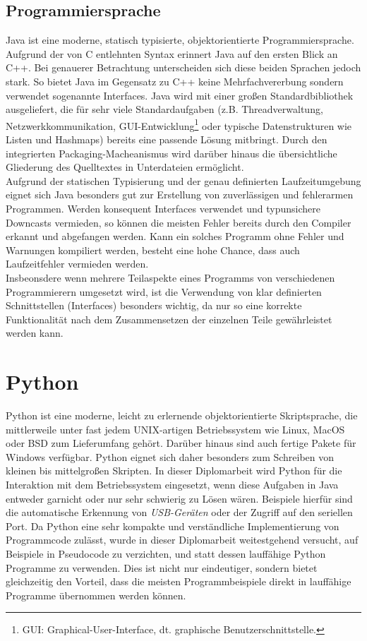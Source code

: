     \subsection{Programmiersprache}
        Java ist eine moderne, statisch typisierte, objektorientierte Programmiersprache. Aufgrund der von C entlehnten 
        Syntax erinnert Java auf den ersten Blick an C++. Bei genauerer Betrachtung unterscheiden sich diese beiden 
        Sprachen jedoch stark. So bietet Java im Gegensatz zu C++ keine Mehrfachvererbung sondern verwendet sogenannte
        Interfaces. Java wird mit einer großen Standardbibliothek ausgeliefert, die für sehr viele Standardaufgaben
        (z.B. Threadverwaltung, Netzwerkkommunikation, GUI-Entwicklung\footnote{GUI: Graphical-User-Interface, dt. 
        graphische Benutzerschnittstelle.} oder typische Datenstrukturen wie Listen und Hashmaps) bereits eine
        passende Lösung mitbringt. Durch den integrierten Packaging-Macheanismus wird darüber hinaus die übersichtliche
        Gliederung des Quelltextes in Unterdateien ermöglicht.\\
        Aufgrund der statischen Typisierung und der genau definierten Laufzeitumgebung eignet sich Java besonders
        gut zur Erstellung von zuverlässigen und fehlerarmen Programmen. Werden konsequent Interfaces verwendet und
        typunsichere Downcasts vermieden, so können die meisten Fehler bereits durch den Compiler erkannt und abgefangen 
        werden. Kann ein solches Programm ohne Fehler und Warnungen kompiliert werden, besteht eine hohe Chance,
        dass auch Laufzeitfehler vermieden werden.\\
        Insbeonsdere wenn mehrere Teilaspekte eines Programms von verschiedenen Programmierern umgesetzt wird, 
        ist die Verwendung von klar definierten Schnittstellen (Interfaces) besonders wichtig, da nur so eine korrekte
        Funktionalität nach dem Zusammensetzen der einzelnen Teile gewährleistet werden kann.

\section{Python}
    Python ist eine moderne, leicht zu erlernende objektorientierte Skriptsprache, die mittlerweile unter fast
    jedem UNIX-artigen Betriebssystem wie Linux, MacOS oder BSD zum Lieferumfang gehört. Darüber hinaus sind
    auch fertige Pakete für Windows verfügbar. Python eignet sich daher besonders zum Schreiben von kleinen
    bis mittelgroßen Skripten. In dieser Diplomarbeit wird Python für die Interaktion mit dem Betriebssystem
    eingesetzt, wenn diese Aufgaben in Java entweder garnicht oder nur sehr schwierig zu Lösen wären. Beispiele
    hierfür sind die automatische Erkennung von \emph{USB-Geräten} oder der Zugriff auf den seriellen Port.
    Da Python eine sehr kompakte und verständliche Implementierung von Programmcode zulässt, wurde in dieser
    Diplomarbeit weitestgehend versucht, auf Beispiele in Pseudocode zu verzichten, und statt dessen lauffähige
    Python Programme zu verwenden. Dies ist nicht nur eindeutiger, sondern bietet gleichzeitig den Vorteil,
    dass die meisten Programmbeispiele direkt in lauffähige Programme übernommen werden können.

